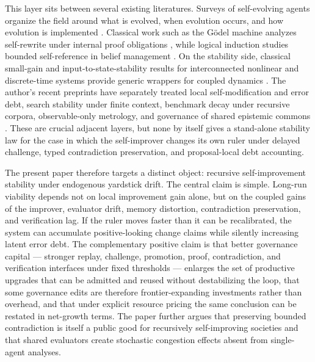 \documentclass[11pt]{article}
\theoremstyle{definition}
\newcommand{\1}{\mathbf{1}}
\begin{document}
This layer sits between several existing literatures. Surveys of self-evolving agents organize the field around what is evolved, when evolution occurs, and how evolution is implemented \cite{SelfEvolvingSurvey2025}. Classical work such as the G\"odel machine analyzes self-rewrite under internal proof obligations \cite{Schmidhuber2007}, while logical induction studies bounded self-reference in belief management \cite{Garrabrant2016}. On the stability side, classical small-gain and input-to-state-stability results for interconnected nonlinear and discrete-time systems provide generic wrappers for coupled dynamics \cite{JiangTeelPraly1994,JiangWang2001}. The author's recent preprints have separately treated local self-modification and error debt, search stability under finite context, benchmark decay under recursive corpora, observable-only metrology, and governance of shared epistemic commons \cite{TakahashiPV2026,TakahashiSearch2026,TakahashiBH2026,TakahashiMTE2026,TakahashiSEC2026}. These are crucial adjacent layers, but none by itself gives a stand-alone stability law for the case in which the self-improver changes its own ruler under delayed challenge, typed contradiction preservation, and proposal-local debt accounting.

The present paper therefore targets a distinct object: recursive self-improvement stability under endogenous yardstick drift. The central claim is simple. Long-run viability depends not on local improvement gain alone, but on the coupled gains of the improver, evaluator drift, memory distortion, contradiction preservation, and verification lag. If the ruler moves faster than it can be recalibrated, the system can accumulate positive-looking change claims while silently increasing latent error debt. The complementary positive claim is that better governance capital --- stronger replay, challenge, promotion, proof, contradiction, and verification interfaces under fixed thresholds --- enlarges the set of productive upgrades that can be admitted and reused without destabilizing the loop, that some governance edits are therefore frontier-expanding investments rather than overhead, and that under explicit resource pricing the same conclusion can be restated in net-growth terms. The paper further argues that preserving bounded contradiction is itself a public good for recursively self-improving societies and that shared evaluators create stochastic congestion effects absent from single-agent analyses.
\end{document}
